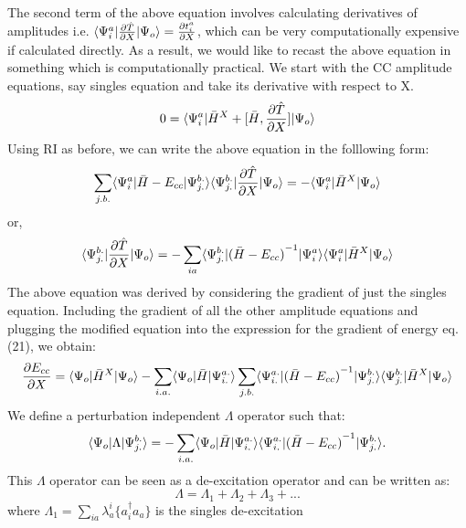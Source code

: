 The second term of the above equation involves calculating derivatives of
amplitudes i.e. $\langle {\Psi}^{a}_{i} |\frac{\partial{\hat T}}{\partial
X}| \Psi_o \rangle = \frac{\partial{t^a_i}}{\partial X}$, which can be very
computationally expensive if calculated directly. As a result, we would like to
recast the above equation in something which is computationally practical. We
start with the CC amplitude equations, say singles equation and take
its derivative with respect to X.
\begin{equation} 
0 = \langle {\Psi}^a_i |{\bar{H}}^X + \lbrack\bar H , \frac{\partial{\hat T}}{\partial
X}\rbrack| \Psi_o \rangle 
\end{equation} 
Using RI as before, we can write the above equation in the folllowing form:
\begin{equation}
\sum_{j.b.}\langle {\Psi}^a_i |\bar{H}-E_{cc}| {\Psi}^{b.}_{j.} \rangle\langle {\Psi}^{b.}_{j.} |\frac{\partial{\hat T}}{\partial X}| \Psi_o \rangle = - \langle {\Psi}^a_i |{\bar{H}}^X| \Psi_o \rangle 
\end{equation}
or,
\begin{equation} \langle {\Psi}^{b.}_{j.} |\frac{\partial{\hat T}}{\partial
X}| \Psi_o \rangle = -\sum_{ia}
\langle {\Psi}^{b.}_{j.} |{(\bar{H}-E_{cc})}^{-1}| {\Psi}^a_i \rangle\langle {\Psi}^a_i |{\bar{H}}^X| \Psi_o \rangle
\end{equation}
The above equation was derived by considering the gradient of just the singles equation.
Including the gradient of all the other amplitude equations and plugging the modified 
equation into the expression for the gradient of energy eq.(21), we obtain:
\begin{equation}
\frac{\partial{E_{cc}}}{\partial X} = \langle \Psi_o |{\bar{H}}^X| \Psi_o \rangle -
\sum_{i.a.}\langle \Psi_o |\bar{H}| {\Psi}^{a.}_{i.} \rangle\sum_{j.b.}
\langle {\Psi}^{a.}_{i.} |{(\bar{H}-E_{cc})}^{-1}| {\Psi}^{b.}_{j.} \rangle
\langle {\Psi}^{b.}_{j.} |{\bar{H}}^X| \Psi_o \rangle
\end{equation}
We define a perturbation independent $\Lambda$ operator such that:
\begin{equation}
\langle \Psi_o |\Lambda| \Psi^{b.}_{j.} \rangle = -\sum_{i.a.}\langle \Psi_o |\bar{H}| {\Psi}^{a.}_{i.} \rangle
\langle {\Psi}^{a.}_{i.} |{(\bar{H}-E_{cc})}^{-1}| {\Psi}^{b.}_{j.} \rangle.
\end{equation}
This $\Lambda$ operator can be seen as a de-excitation operator and can be written as:
\begin{equation}
\Lambda = \Lambda_1 + \Lambda_2 + \Lambda_3 + ...
\end{equation} 
where $\Lambda_1 = \sum_{ia}\lambda^i_a\{{a}^\dagger_i a_a\}$ is the singles de-excitation
